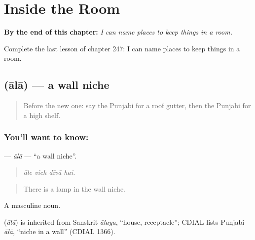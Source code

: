 
\chapter{Inside the Room}
\label{ch:pa-a2-inside-the-room}

\begin{chapteropening}
\textbf{By the end of this chapter:} \emph{I can name places to keep things in a room.}

Complete the last lesson of chapter 247: I can name places to keep things in a room.
\end{chapteropening}

\section[\texorpdfstring{\pa{ਆਲਾ} (ālā)}{ਆਲਾ (ālā)}]{ (ālā) — a wall niche}

\label{lesson:PA-C247-ala}



\begin{quote}
Before the new one: say the Punjabi for a roof gutter, then the Punjabi for a high shelf.
\end{quote}

\subsection*{You'll want to know: }
\textbf{} — \emph{ālā} — \textquotedblleft{}a wall niche\textquotedblright{}.

\begin{quote}
   
\end{quote}

\begin{quote}
\emph{āle vich dīvā hai.}
\end{quote}

\begin{quote}
There is a lamp in the wall niche.
\end{quote}

A masculine noun.

\begin{cousinweb}
\textbf{} (\emph{ālā}) is inherited from Sanskrit \emph{ālaya}, \textquotedblleft{}house, receptacle\textquotedblright{}; CDIAL lists Punjabi \emph{ālā}, \textquotedblleft{}niche in a wall\textquotedblright{} (CDIAL 1366).
\end{cousinweb}


